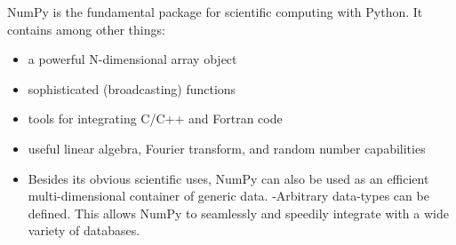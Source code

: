 \documentclass[11pt]{article} %
\begin{document}
\large
\tableofcontents
NumPy is the fundamental package for scientific computing with Python. It contains among other things:
\begin{itemize}
\item a powerful N-dimensional array object
\item sophisticated (broadcasting) functions
\item tools for integrating C/C++ and Fortran code
\item useful linear algebra, Fourier transform, and random number capabilities
\item Besides its obvious scientific uses, NumPy can also be used as an efficient multi-dimensional container of generic data.  -Arbitrary data-types can be defined. This allows NumPy to seamlessly and speedily integrate with a wide variety of databases.
\end{itemize}





\end{document}
